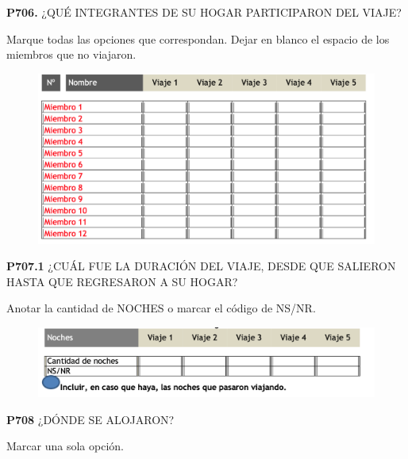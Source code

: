 \documentclass[
  openany]{book}
\begin{document}
\textbf{P706.} ¿QUÉ INTEGRANTES DE SU HOGAR PARTICIPARON DEL VIAJE?

Marque todas las opciones que correspondan. Dejar en blanco el espacio de los miembros que no viajaron.

\begin{figure}

{\centering \includegraphics[width=1\linewidth]{imagenes/figura6-240} 

}

\end{figure}

\textbf{P707.1} ¿CUÁL FUE LA DURACIÓN DEL VIAJE, DESDE QUE SALIERON HASTA QUE REGRESARON A SU HOGAR?

Anotar la cantidad de NOCHES o marcar el código de NS/NR.

\begin{figure}

{\centering \includegraphics[width=1\linewidth]{imagenes/figura6-241} 

}

\end{figure}

\textbf{P708} ¿DÓNDE SE ALOJARON?

Marcar una sola opción.
\end{document}
